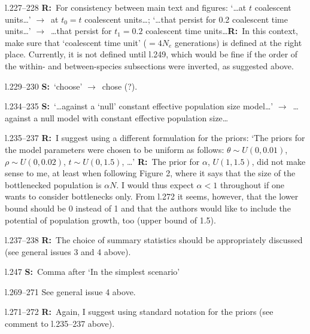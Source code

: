 \documentclass[11pt]{article}
\newenvironment{my_description}
{\begin{description}
  \setlength{\itemsep}{2pt}
  \setlength{\parskip}{0pt}
  \setlength{\parsep}{0pt}}
{\end{description}}
\newcommand{\ra}{$\rightarrow$\ }
\newcommand{\R}{\textbf{R:}\ }
\newcommand{\V}{\textbf{S:}\ }
\begin{document}
\begin{my_description}
	\item[l.227--228] \R For consistency between main text and figures: `\dots at $t$ coalescent units\dots' \ra at $t_0 = t$ coalescent units\dots; `\dots that persist for 0.2 coalescent time units\dots' \ra \dots that persist for $t_1 = 0.2$ coalescent time units\dots \R In this context, make sure that `coalescent time unit' ($=4N_e$ generations) is defined at the right place. Currently, it is not defined until l.249, which would be fine if the order of the within- and between-species subsections were inverted, as suggested above.
	\item[l.229--230] \V `choose' \ra chose (?).
	\item[l.234--235] \V `\dots against a `null' constant effective population size model\dots' \ra \dots against a null model with constant effective population size\dots
	\item[l.235--237] \R I suggest using a different formulation for the priors: `The priors for the model parameters were chosen to be uniform as follows: $\theta \sim U(0, 0.01)$, $\rho \sim U(0, 0.02)$, $t \sim U(0, 1.5)$, \dots' \R The prior for $\alpha$,  $U(1,1.5)$, did not make sense to me, at least when following Figure 2, where it says that the size of the bottlenecked population is $\alpha N$. I would thus expect $\alpha < 1$ throughout if one wants to consider bottlenecks only. From l.272 it seems, however, that the lower bound should be 0 instead of 1 and that the authors would like to include the potential of population growth, too (upper bound of 1.5).
	\item[l.237--238] \R The choice of summary statistics should be appropriately discussed (see general issues 3 and 4 above).
	\item[l.247] \V Comma after `In the simplest scenario'
	\item[l.269--271] See general issue 4 above.
	\item[l.271--272] \R Again, I suggest using standard notation for the priors (see comment to l.235--237 above).
\end{my_description}
\end{document}
